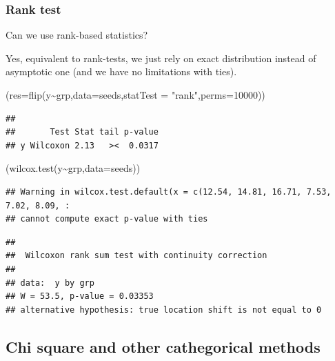 \documentclass[
]{article}
\newenvironment{Shaded}{\begin{snugshade}}{\end{snugshade}}
\newcommand{\AttributeTok}[1]{\textcolor[rgb]{0.77,0.63,0.00}{#1}}
\newcommand{\DecValTok}[1]{\textcolor[rgb]{0.00,0.00,0.81}{#1}}
\newcommand{\FunctionTok}[1]{\textcolor[rgb]{0.00,0.00,0.00}{#1}}
\newcommand{\NormalTok}[1]{#1}
\newcommand{\SpecialCharTok}[1]{\textcolor[rgb]{0.00,0.00,0.00}{#1}}
\newcommand{\StringTok}[1]{\textcolor[rgb]{0.31,0.60,0.02}{#1}}
\begin{document}
\hypertarget{rank-test}{%
\subsubsection{Rank test}\label{rank-test}}

Can we use rank-based statistics?

Yes, equivalent to rank-tests, we just rely on exact distribution
instead of asymptotic one (and we have no limitations with ties).

\begin{Shaded}
\begin{Highlighting}[]
\NormalTok{(}\AttributeTok{res=}\FunctionTok{flip}\NormalTok{(y}\SpecialCharTok{\textasciitilde{}}\NormalTok{grp,}\AttributeTok{data=}\NormalTok{seeds,}\AttributeTok{statTest =} \StringTok{"rank"}\NormalTok{,}\AttributeTok{perms=}\DecValTok{10000}\NormalTok{))}
\end{Highlighting}
\end{Shaded}

\begin{verbatim}
## 
##       Test Stat tail p-value
## y Wilcoxon 2.13   ><  0.0317
\end{verbatim}

\begin{Shaded}
\begin{Highlighting}[]
\NormalTok{(}\FunctionTok{wilcox.test}\NormalTok{(y}\SpecialCharTok{\textasciitilde{}}\NormalTok{grp,}\AttributeTok{data=}\NormalTok{seeds))}
\end{Highlighting}
\end{Shaded}

\begin{verbatim}
## Warning in wilcox.test.default(x = c(12.54, 14.81, 16.71, 7.53, 7.02, 8.09, :
## cannot compute exact p-value with ties
\end{verbatim}

\begin{verbatim}
## 
##  Wilcoxon rank sum test with continuity correction
## 
## data:  y by grp
## W = 53.5, p-value = 0.03353
## alternative hypothesis: true location shift is not equal to 0
\end{verbatim}

\hypertarget{chi-square-and-other-cathegorical-methods}{%
\subsection{Chi square and other cathegorical
methods}\label{chi-square-and-other-cathegorical-methods}}
\end{document}
